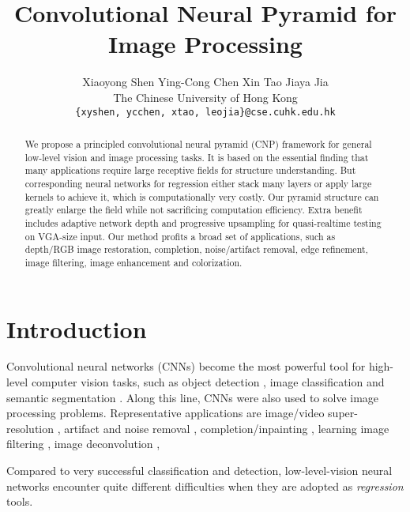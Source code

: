 \documentclass[10pt,twocolumn,letterpaper]{article}
\begin{document}
\title{Convolutional Neural Pyramid for Image Processing}

\author{Xiaoyong Shen \quad Ying-Cong Chen \quad Xin Tao \quad Jiaya Jia\\
The Chinese University of Hong Kong\\
{\tt\small \{xyshen, ycchen, xtao, leojia\}@cse.cuhk.edu.hk}}

\maketitle

\begin{abstract}

We propose a principled convolutional neural pyramid (CNP) framework for general
low-level vision and image processing tasks. It is based on the essential finding that
many applications require large receptive fields for structure understanding. But
corresponding neural networks for regression either stack many layers or apply large
kernels to achieve it, which is computationally very costly. Our pyramid structure can
greatly enlarge the field while not sacrificing computation efficiency. Extra benefit
includes adaptive network depth and progressive upsampling for quasi-realtime testing on
VGA-size input. Our method profits a broad set of applications, such as depth/RGB image
restoration, completion, noise/artifact removal, edge refinement, image filtering, image
enhancement and colorization.
\end{abstract}

\section{Introduction}

Convolutional neural networks (CNNs) become the most powerful tool for high-level
computer vision tasks, such as object detection \cite{Girshick15}, image classification
\cite{KrizhevskySH12} and semantic segmentation \cite{LongSD15}. Along this line, CNNs
were also used to solve image processing problems. Representative applications are
image/video super-resolution
\cite{DongLHT16_SRCNN,DongLT16,KimLL15a,KimLL15b,LiaoTLMJ15}, artifact and noise removal
\cite{DongDLT15,EigenKF13,MaoSY16a}, completion/inpainting \cite{RenXYS15,XieXC12},
learning image filtering \cite{XuRYLJ15,LiuP016}, image deconvolution \cite{XuRLJ14},
\etc

Compared to very successful classification and detection, low-level-vision neural
networks encounter quite different difficulties when they are adopted as {\it regression}
tools.
\end{document}
